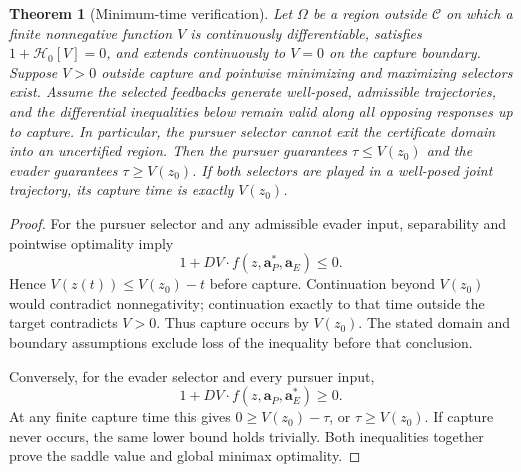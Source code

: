 \documentclass[journal,a4paper]{IEEEtran}
\newtheorem{theorem}{Theorem}
\newcommand{\C}{\mathcal C}
\newcommand{\HH}{\mathcal H}
\begin{document}
\begin{theorem}[Minimum-time verification]
\label{thm:time}
Let $\Omega$ be a region outside $\C$ on which a finite nonnegative function $V$ is continuously differentiable, satisfies $1+\HH_0[V]=0$, and extends continuously to $V=0$ on the capture boundary. Suppose $V>0$ outside capture and pointwise minimizing and maximizing selectors exist. Assume the selected feedbacks generate well-posed, admissible trajectories, and the differential inequalities below remain valid along all opposing responses up to capture. In particular, the pursuer selector cannot exit the certificate domain into an uncertified region. Then the pursuer guarantees $\tau\le V(z_0)$ and the evader guarantees $\tau\ge V(z_0)$. If both selectors are played in a well-posed joint trajectory, its capture time is exactly $V(z_0)$.
\end{theorem}
\begin{proof}
For the pursuer selector and any admissible evader input, separability and pointwise optimality imply
\begin{equation}
 1+DV\cdot f(z,\mathbf a_P^*,\mathbf a_E)\le0.
\end{equation}
Hence $V(z(t))\le V(z_0)-t$ before capture. Continuation beyond $V(z_0)$ would contradict nonnegativity; continuation exactly to that time outside the target contradicts $V>0$. Thus capture occurs by $V(z_0)$. The stated domain and boundary assumptions exclude loss of the inequality before that conclusion.

Conversely, for the evader selector and every pursuer input,
\begin{equation}
 1+DV\cdot f(z,\mathbf a_P,\mathbf a_E^*)\ge0.
\end{equation}
At any finite capture time this gives $0\ge V(z_0)-\tau$, or $\tau\ge V(z_0)$. If capture never occurs, the same lower bound holds trivially. Both inequalities together prove the saddle value and global minimax optimality.
\end{proof}
\end{document}
